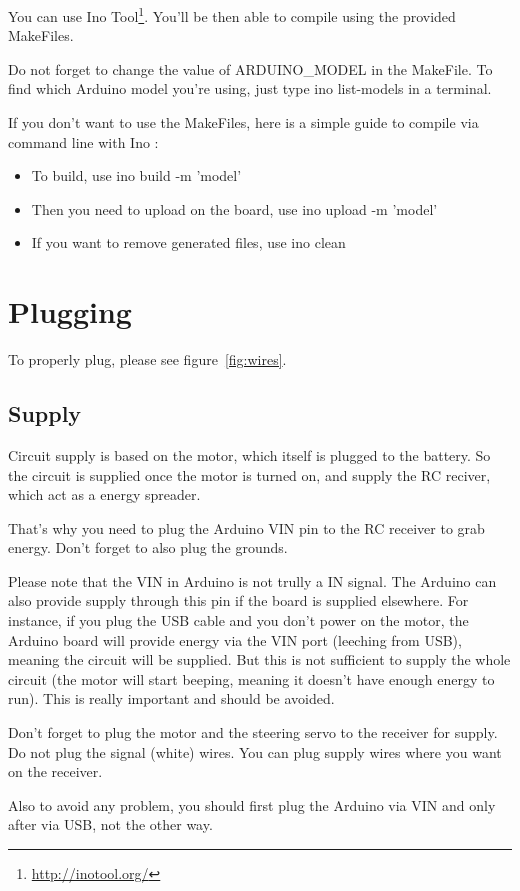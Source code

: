 \documentclass[a4paper,11pt]{report}
\begin{document}
You can use Ino Tool\footnote{\url{http://inotool.org/}}. You'll be then able
to compile using the provided MakeFiles.

Do not forget to change the value of ARDUINO\_MODEL in the MakeFile. To find
which Arduino model you're using, just type ino list-models in a terminal.

If you don't want to use the MakeFiles, here is a simple guide to compile via
command line with Ino :
\begin{itemize}
    \item To build, use ino build -m 'model' 
    \item Then you need to upload on the board, use ino upload -m 'model'
    \item If you want to remove generated files, use ino clean
\end{itemize}

\section{Plugging}
To properly plug, please see figure~\ref{fig:wires}.

\subsection{Supply}
Circuit supply is based on the motor, which itself is plugged to the
battery. So the circuit is supplied once the motor is turned on, and supply the
RC reciver, which act as a energy spreader.

That's why you need to plug the Arduino VIN pin to the RC receiver to grab
energy. Don't forget to also plug the grounds.

Please note that the VIN in Arduino is not trully a IN signal. The Arduino can
also provide supply through this pin if the board is supplied elsewhere. For
instance, if you plug the USB cable and you don't power on the motor, the
Arduino board will provide energy via the VIN port (leeching from USB), meaning
the circuit will be supplied. But this is not sufficient to supply the whole
circuit (the motor will start beeping, meaning it doesn't have enough energy to
run). This is really important and should be avoided.

Don't forget to plug the motor and the steering servo to the receiver for
supply. Do not plug the signal (white) wires. You can plug supply wires where
you want on the receiver.

Also to avoid any problem, you should first plug the Arduino via VIN and only
after via USB, not the other way.
\end{document}

